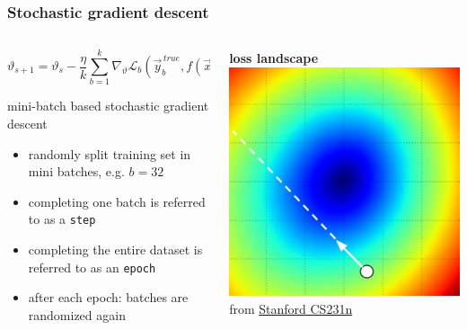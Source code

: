 \documentclass[
  aspectratio=1610, %
  intlimits %
]{beamer}
\renewcommand\footnotesize{\tiny}
\begin{document}
 \begin{frame}
   \frametitle{Stochastic gradient descent}
   \vspace{-1em}
\begin{columns}
  \begin{column}{.475\textwidth}
    \begin{equation*}
\vartheta_{s+1} = \vartheta_{s} - \frac{\eta}{k} \sum_{b=1}^{k} \nabla_{\vartheta}\mathcal{L}_b( \vec{y}^{\,true}_b, f(\vec{x}_b, \vartheta_{s}))
\end{equation*}

\begin{block}{mini-batch based stochastic gradient descent}

  \begin{itemize}
  \item randomly split training set in mini batches, e.g. $b=32$
  \item completing one batch is referred to as a \texttt{step}
  \item completing the entire dataset is referred to as an \texttt{epoch}
  \item after each epoch: batches are randomized again
  \end{itemize}
\end{block}
\end{column}

\begin{column}{.475\textwidth}
  \centering
  \textbf{loss landscape}
  \footnotesize
  \includegraphics[width=.9\textwidth]{figures/stepsize}\\
  from \href{https://cs231n.github.io/optimization-1/}{Stanford CS231n}
  \end{column}
\end{columns}
\end{frame}
\end{document}
